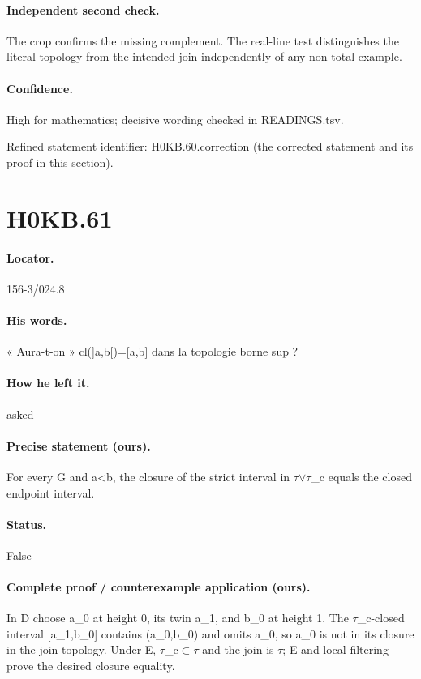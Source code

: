 \paragraph{Independent second check.} The crop confirms the missing complement. The real-line test distinguishes the literal topology from the intended join independently of any non-total example.

\paragraph{Confidence.} High for mathematics; decisive wording checked in READINGS.tsv.

\noindent Refined statement identifier: H0KB.60.correction (the corrected statement and its proof in this section).

\section*{H0KB.61}\label{statement:H0KB.61}
\paragraph{Locator.} 156-3/024.8

\paragraph{His words.} « Aura-t-on » cl(]a,b[)=[a,b] dans la topologie borne sup ?

\paragraph{How he left it.} asked

\paragraph{Precise statement (ours).} For every G and a<b, the closure of the strict interval in \ensuremath{\tau}\ensuremath{\vee}\ensuremath{\tau}\_c equals the closed endpoint interval.

\paragraph{Status.} False

\paragraph{Complete proof / counterexample application (ours).} In D choose a\_0 at height 0, its twin a\_1, and b\_0 at height 1. The \ensuremath{\tau}\_c-closed interval [a\_1,b\_0] contains (a\_0,b\_0) and omits a\_0, so a\_0 is not in its closure in the join topology. Under E, \ensuremath{\tau}\_c\ensuremath{\subset}\ensuremath{\tau} and the join is \ensuremath{\tau}; E and local filtering prove the desired closure equality.

